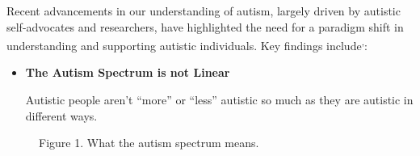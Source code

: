 \documentclass[
  letterpaper,
  DIV=11,
  numbers=noendperiod]{scrreprt}
\begin{document}
Recent advancements in our understanding of autism, largely driven by
autistic self-advocates and researchers, have highlighted the need for a
paradigm shift in understanding and supporting autistic individuals. Key
findings
include\textsuperscript{,}:

\begin{itemize}
\item
  \textbf{The Autism Spectrum is not Linear}

  Autistic people aren't ``more'' or ``less'' autistic so much as they
  are autistic in different ways.
\end{itemize}

\begin{figure}


\caption{\label{fig-autism-spectrum}Figure 1. What the autism spectrum
means.}

\end{figure}%
\end{document}
